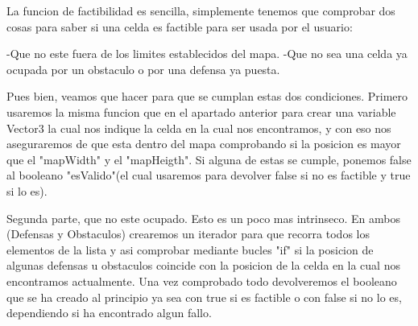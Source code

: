     La funcion de factibilidad es sencilla, simplemente tenemos que comprobar dos cosas para saber si una celda es factible para ser usada por el usuario:

    -Que no este fuera de los limites establecidos del mapa.
    -Que no sea una celda ya ocupada por un obstaculo o por una defensa ya puesta.

    Pues bien, veamos que hacer para que se cumplan estas dos condiciones. Primero usaremos la misma funcion que en el apartado anterior para crear una variable Vector3
la cual nos indique la celda en la cual nos encontramos, y con eso nos aseguraremos de que esta dentro del mapa comprobando si la posicion es mayor que el "mapWidth" y
el "mapHeigth". Si alguna de estas se cumple, ponemos false al booleano "esValido"(el cual usaremos para devolver false si no es factible y true si lo es).

    Segunda parte, que no este ocupado. Esto es un poco mas intrinseco. En ambos (Defensas y Obstaculos) crearemos un iterador para que recorra todos los elementos de la lista
y asi comprobar mediante bucles "if" si la posicion de algunas defensas u obstaculos coincide con la posicion de la celda en la cual nos encontramos actualmente.
    Una vez comprobado todo devolveremos el booleano que se ha creado al principio ya sea con true si es factible o con false si no lo es, dependiendo si ha encontrado algun fallo.
